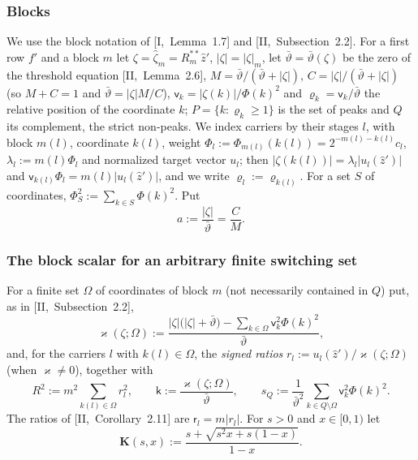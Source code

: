 \documentclass[10pt]{amsart}
\theoremstyle{definition}
\theoremstyle{remark}
\newcommand{\zh}{\hat z}
\begin{document}
\subsubsection*{Blocks}
We use the block notation of [I,~Lemma~1.7] and [II,~Subsection~2.2].  For a
first row $f'$ and a block $m$ let $\zeta=\hat\zeta_m=R_m^{**}\zh'$,
$|\zeta|=|\zeta|_m$, let $\bar\vartheta=\bar\vartheta(\zeta)$ be the zero of
the threshold equation [II,~Lemma~2.6], $M=\bar\vartheta/(\bar\vartheta+
|\zeta|)$, $C=|\zeta|/(\bar\vartheta+|\zeta|)$ (so $M+C=1$ and $\bar\vartheta=
|\zeta|M/C$), $\mathsf v_k=|\zeta(k)|/\Phi(k)^2$ and $\varrho_k=\mathsf v_k/
\bar\vartheta$ the relative position of the coordinate $k$; $P=\{k:\varrho_k\ge1\}$
is the set of peaks and $Q$ its complement, the strict non-peaks.  We index
carriers by their stages $l$, with block $m(l)$, coordinate $k(l)$, weight
$\Phi_l:=\Phi_{m(l)}(k(l))=2^{-m(l)-k(l)}c_l$, $\lambda_l:=m(l)\Phi_l$ and
normalized target vector $u_l$; then $|\zeta(k(l))|=\lambda_l|u_l(\zh')|$ and
$\mathsf v_{k(l)}\Phi_l=m(l)|u_l(\zh')|$, and we write $\varrho_l:=
\varrho_{k(l)}$.  For a set $S$ of coordinates, $\Phi_S^2:=\sum_{k\in S}
\Phi(k)^2$.  Put
\[
 a:=\frac{|\zeta|}{\bar\vartheta}=\frac CM .
\]

\subsubsection*{The block scalar for an arbitrary finite switching set}
For a finite set $\Omega$ of coordinates of block $m$ (not necessarily
contained in $Q$) put, as in [II,~Subsection~2.2],
\[
 \varkappa(\zeta;\Omega):=\frac{|\zeta|\big(|\zeta|+\bar\vartheta\big)-
 \sum_{k\in\Omega}\mathsf v_k^2\Phi(k)^2}{\bar\vartheta},
\]
and, for the carriers $l$ with $k(l)\in\Omega$, the \emph{signed ratios}
$r_l:=u_l(\zh')/\varkappa(\zeta;\Omega)$ (when $\varkappa\ne0$), together with
\[
 R^2:=m^2\sum_{k(l)\in\Omega}r_l^2,\qquad \mathsf k:=
 \frac{\varkappa(\zeta;\Omega)}{\bar\vartheta},\qquad s_Q:=\frac1{\bar\vartheta^2}
 \sum_{k\in Q\setminus\Omega}\mathsf v_k^2\Phi(k)^2 .
\]
The ratios of [II,~Corollary~2.11] are $\mathsf r_l=m|r_l|$.  For
$s>0$ and $x\in[0,1)$ let
\[
 \mathbf K(s,x):=\frac{s+\sqrt{s^2x+s(1-x)}}{1-x}.
\]
\end{document}
